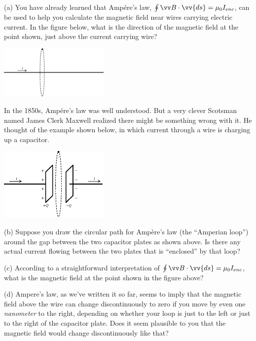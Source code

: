 (a) You have already learned that Amp\'ere's law, $\oint \vv B \cdot \vv{ds} = \mu_0I_{enc}$, can be used to help you calculate the magnetic field near wires carrying electric current.  In the figure below, what is the direction of the magnetic field at the point shown, just above the current carrying wire?

\begin{center}
    \includegraphics[width=0.4\textwidth]{deriving_em_waves/wire_and_loop.eps}
\end{center}

In the 1850s, Amp\'ere's law was well understood.  But a very clever Scotsman named James Clerk Maxwell realized there might be something wrong with it.  He thought of the example shown below, in which current through a wire is charging up a capacitor.
\begin{center}
    \includegraphics[width=0.4\textwidth]{deriving_em_waves/capacitor_and_loop.eps}
\end{center}

(b) Suppose you draw the circular path for Amp\`ere's law (the ``Amperian loop'') around the gap between the two capacitor plates as shown above.  Is there any actual current flowing between the two plates that is ``enclosed'' by that loop?   
\vspace{0.5in}

(c) According to a straightforward interpretation of $\oint \vv B \cdot \vv{ds} = \mu_0I_{enc}$, what is the magnetic field at the point shown in the figure above?  
\vspace{0.4in}

(d) Ampere's law, as we've written it so far, seems to imply that the magnetic field above the wire can change discontinuously to zero if you move by even one \textit{nanometer} to the right, depending on whether your loop is just to the left or just to the right of the capacitor plate.  Does it seem plausible to you that the magnetic field would change discontinuously like that?
\vspace{0.5in}

